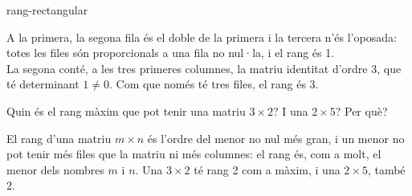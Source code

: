\begin{apartats}
\begin{tria}{rang-rectangular}
\begin{solucio}
A la primera, la segona fila és el doble de la primera i la tercera n'és l'oposada: totes les files són
proporcionals a una fila no nul·la, i el rang és 1.\\
La segona conté, a les tres primeres columnes, la matriu identitat d'ordre 3, que té determinant $1\ne0$.
Com que només té tres files, el rang és 3.
\end{solucio}
\end{tria}

\begin{nomesllarg}
Quin és el rang màxim que pot tenir una matriu $3\times2$? I una $2\times5$? Per què?

\begin{solucio}
El rang d'una matriu $m\times n$ és l'ordre del menor no nul més gran, i un menor no pot tenir més files
que la matriu ni més columnes: el rang és, com a molt, el menor dels nombres $m$ i $n$. Una $3\times2$ té
rang 2 com a màxim, i una $2\times5$, també 2.
\end{solucio}
\end{nomesllarg}

\end{apartats}
